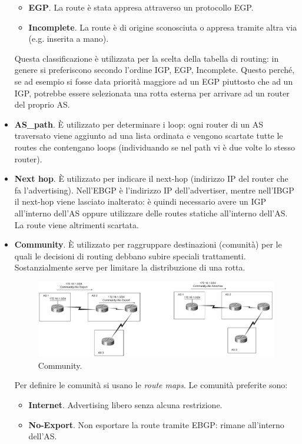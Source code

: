 \begin{itemize}
\begin{itemize}
		\item \textbf{EGP}. La route è stata appresa attraverso un protocollo EGP.
		\item \textbf{Incomplete}. La route è di origine sconosciuta o appresa tramite altra via (e.g. inserita a mano).
	\end{itemize}
	Questa classificazione è utilizzata per la scelta della tabella di routing: in genere si preferiscono secondo l'ordine IGP, EGP, Incomplete. Questo perché, se ad esempio si fosse data priorità maggiore ad un EGP piuttosto che ad un IGP, potrebbe essere selezionata una rotta esterna per arrivare ad un router del proprio AS.
	\item \textbf{AS\_path}. È utilizzato per determinare i loop: ogni router di un AS traversato viene aggiunto ad una lista ordinata e vengono scartate tutte le routes che contengano loops (individuando se nel path vi è due volte lo stesso router).
	\item \textbf{Next hop}. È utilizzato per indicare il next-hop (indirizzo IP del router che fa l'advertising). Nell'EBGP è l'indirizzo IP dell'advertiser, mentre nell'IBGP il next-hop viene lasciato inalterato: è quindi necessario avere un IGP all'interno dell'AS oppure utilizzare delle routes statiche all'interno dell'AS. La route viene altrimenti scartata.
	\item \textbf{Community}. È utilizzato per raggruppare destinazioni (comunità) per le quali le decisioni di routing debbano subire speciali trattamenti. Sostanzialmente serve per limitare la distribuzione di una rotta.
	\begin{figure}[htbp]
		\centering
		\includegraphics[scale = 0.5]{images/community}
		\caption{Community.}
		\label{img:community}
	\end{figure}
	Per definire le comunità si usano le \textit{route maps}. Le comunità preferite sono:
	\begin{itemize}
		\item \textbf{Internet}. Advertising libero senza alcuna restrizione.
		\item \textbf{No-Export}. Non esportare la route tramite EBGP: rimane all'interno dell'AS.

\end{itemize}
\end{itemize}
